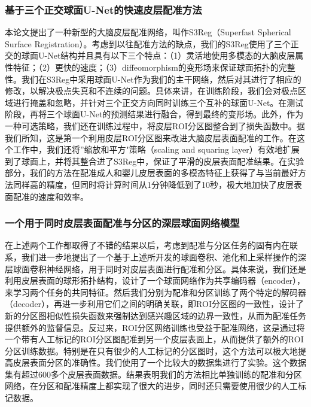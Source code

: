 \subsubsection{基于三个正交球面U-Net的快速皮层配准方法}
本论文提出了一种新型的大脑皮层配准网络，叫作S3Reg（Superfast Spherical Surface Registration）。考虑到以往配准方法的缺点，我们的S3Reg使用了三个正交的球面U-Net结构并且具有以下三个特点：（1）灵活地使用多模态的大脑皮层属性特征；（2）更快的速度；（3）diffeomorphism的变形场来保证球面拓扑的完整性。我们在S3Reg中采用球面U-Net作为我们的主干网络，然后对其进行了相应的修改，以解决极点失真和不连续的问题。具体来讲，在训练阶段，我们会对极点区域进行掩盖和忽略，并针对三个正交方向同时训练三个互补的球面U-Net。在测试阶段，再将三个球面U-Net的预测结果进行融合，得到最终的变形场。此外，作为一种可选策略，我们还在训练过程中，将皮层ROI分区图整合到了损失函数中。据我们所知，这是第一个利用皮层ROI分区图来改进大脑皮层表面配准的工作。在这个工作中，我们还将”缩放和平方"策略（scaling and squaring layer）有效地扩展到了球面上，并将其整合进了S3Reg中，保证了平滑的皮层表面配准结果。在实验部分，我们的方法在配准成人和婴儿皮层表面的多模态特征上获得了与当前最好方法同样高的精度，但同时将计算时间从1分钟降低到了10秒，极大地加快了皮层表面配准的速度和效率。

\subsubsection{一个用于同时皮层表面配准与分区的深层球面网络模型}
在上述两个工作都取得了不错的结果以后，考虑到配准与分区任务的固有内在联系，我们进一步地提出了一个基于上述所开发的球面卷积、池化和上采样操作的深层球面卷积神经网络，用于同时对皮层表面进行配准和分区。具体来说，我们还是利用皮层表面的球形拓扑结构，设计了一个球面网络作为共享编码器（encoder），来学习两个任务的共同特征。然后我们分别为配准和分区训练了两个特定的解码器（decoder），再进一步利用它们之间的明确关联，即ROI分区图的一致性，设计了新的分区图相似性损失函数来强制达到感兴趣区域的边界一致性，从而为配准任务提供额外的监督信息。反过来，ROI分区网络训练也受益于配准网络，这是通过将一个带有人工标记的ROI分区图配准到另一个皮层表面上，从而提供了额外的ROI分区训练数据。特别是在只有很少的人工标记的分区图时，这个方法可以极大地提高皮层表面分区的准确性。我们使用了一个比较大的数据集进行了实验。这个数据集有超过600多个皮层表面数据。结果表明我们的方法相比单独训练的配准和分区网络，在分区和配准精度上都实现了很大的进步，同时还只需要使用很少的人工标记数据。

